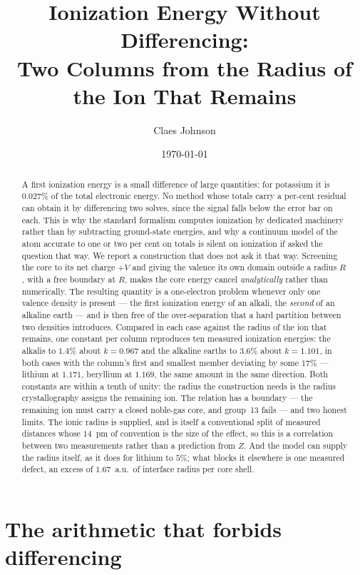 \documentclass[11pt]{article}
\title{Ionization Energy Without Differencing:\\
\large Two Columns from the Radius of the Ion That Remains}
\author[1]{Claes Johnson}
\affil[1]{KTH Royal Institute of Technology, SE-100 44 Stockholm, Sweden \\
\small\texttt{claesjohnson@gmail.com}}
\date{\today}
\begin{document}
\maketitle

\begin{abstract}
A first ionization energy is a small difference of large quantities: for potassium it is
$0.027\%$ of the total electronic energy. No method whose totals carry a per-cent residual can
obtain it by differencing two solves, since the signal falls below the error bar on each. This
is why the standard formalism computes ionization by dedicated machinery rather than by
subtracting ground-state energies, and why a continuum model of the atom accurate to one or two
per cent on totals is silent on ionization if asked the question that way. We report a
construction that does not ask it that way. Screening the core to its net charge $+V$ and giving
the valence its own domain outside a radius $R$, with a free boundary at $R$, makes the core
energy cancel \emph{analytically} rather than numerically. The resulting quantity is a
one-electron problem whenever only one valence density is present --- the first ionization
energy of an alkali, the \emph{second} of an alkaline earth --- and is then free of the
over-separation that a hard partition between two densities introduces. Compared in each case
against the radius of the ion that remains, one constant per column reproduces ten measured
ionization energies: the alkalis to $1.4\%$ about $k=0.967$ and the alkaline
earths to $3.6\%$ about $k=1.101$, in both cases with the column's first and smallest member
deviating by some $17\%$ --- lithium at $1.171$, beryllium at $1.169$, the same amount in the
same direction. Both constants are within a tenth of unity: the radius the construction needs is
the radius crystallography assigns the remaining ion. The relation has a boundary --- the remaining ion must carry a closed
noble-gas core, and group~13 fails --- and two honest limits. The ionic radius is supplied, and
is itself a conventional split of measured distances whose $14$~pm of convention is the size of
the effect, so this is a correlation between two measurements rather than a prediction from $Z$.
And the model can supply the radius itself, as it does for lithium to $5\%$; what blocks it
elsewhere is one measured defect, an excess of $1.67$~a.u.\ of interface radius per core shell.
\end{abstract}

\section{The arithmetic that forbids differencing}\label{sec:arith}
\end{document}
